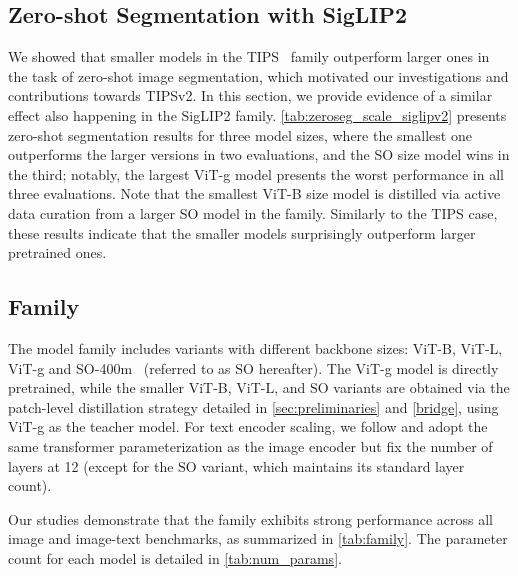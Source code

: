 \subsection{Zero-shot Segmentation with SigLIP2}

We showed that smaller models in the TIPS~\cite{tips_paper} family outperform larger ones in the task of zero-shot image segmentation, which motivated our investigations and contributions towards TIPSv2.
In this section, we provide evidence of a similar effect also happening in the SigLIP2 family.
\cref{tab:zeroseg_scale_siglipv2} presents zero-shot segmentation results for three model sizes, where the smallest one outperforms the larger versions in two evaluations, and the SO size model wins in the third; notably, the largest ViT-g model presents the worst performance in all three evaluations.
Note that the smallest ViT-B size model is distilled via active data curation from a larger SO model in the family.
Similarly to the TIPS case, these results indicate that the smaller models surprisingly outperform larger pretrained ones.




\subsection{\textbf{\tipsvtwo} Family} 
\label{sec:panda_family}



The \tipsvtwo model family includes variants with different backbone sizes: ViT-B, ViT-L, ViT-g and SO-400m~\citep{alabdulmohsin2023sovit} (referred to as $\text{SO}$ hereafter). The ViT-g model is directly pretrained, while the smaller ViT-B, ViT-L, and $\text{SO}$ variants are obtained via the patch-level distillation strategy detailed in \cref{sec:preliminaries} and \cref{bridge}, using $\text{ViT}$-g as the teacher model. For text encoder scaling, we follow \citep{tips_paper} and adopt the same transformer parameterization as the image encoder but fix the number of layers at 12 (except for the $\text{SO}$ variant, which maintains its standard layer count). 

Our studies demonstrate that the \tipsvtwo family exhibits strong performance across all image and image-text benchmarks, as summarized in \cref{tab:family}. The parameter count for each model is detailed in \cref{tab:num_params}.





